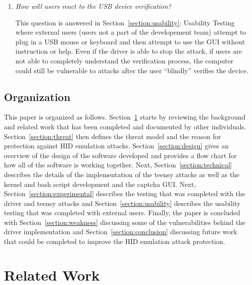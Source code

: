 \documentclass[pagenumbers]{ieee}
\begin{document}
\begin{enumerate}
\item \textit{How will users react to the USB device verification?}

This question is answered in Section~\ref{section:usability}: Usability Testing where external users (users not a part of the developement team) attempt to plug in a USB mouse or keyboard and then attempt to use the GUI without instruction or help. Even if the driver is able to stop the attack, if users are not able to completely understand the verification process, the computer could still be vulnerable to attacks after the user ``blindly'' verifies the device.

\end{enumerate}


\subsection{Organization}
\label{section:organization}

This paper is organized as follows. Section~\ref{section:related} starts by reviewing the background and related work that has been completed and documented by other individuals. Section~\ref{section:threat} then defines the threat model and the reason for protection against HID emulation attacks. Section~\ref{section:design} gives an overview of the design of the software developed and provides a flow chart for how all of the software is working together. Next, Section~\ref{section:technical} describes the details of the implementation of the teensy attacks as well as the kernel and bash script development and the captcha GUI. Next, Section~\ref{section:experimental} describes the testing that was completed with the driver and teensy attacks and Section~\ref{section:usability} describes the usability testing that was completed with external users. Finally, the paper is concluded with Section~\ref{section:weakness} discussing some of the vulnerabilities behind the driver implementation and Section~\ref{section:conclusion} discussing future work that could be completed to improve the HID emulation attack protection.


\section{Related Work}
\label{section:related}
\end{document}
